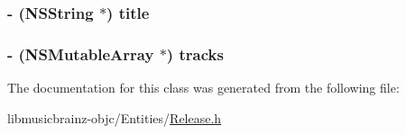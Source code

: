 \hypertarget{interface_release_abfa81ba92436b317726d7a0160e09fb7}{
\subsubsection[{title}]{\setlength{\rightskip}{0pt plus 5cm}-\/ (N\-S\-String $\ast$) {\bf title}}}\label{interface_release_abfa81ba92436b317726d7a0160e09fb7}
\hypertarget{interface_release_a4ea308c448881c31359654ce9b433551}{
\subsubsection[{tracks}]{\setlength{\rightskip}{0pt plus 5cm}-\/ (N\-S\-Mutable\-Array $\ast$) {\bf tracks}}}\label{interface_release_a4ea308c448881c31359654ce9b433551}


The documentation for this class was generated from the following file\-:\begin{DoxyCompactItemize}
\item 
libmusicbrainz-\/objc/\-Entities/\hyperlink{_release_8h}{Release.\-h}\end{DoxyCompactItemize}
